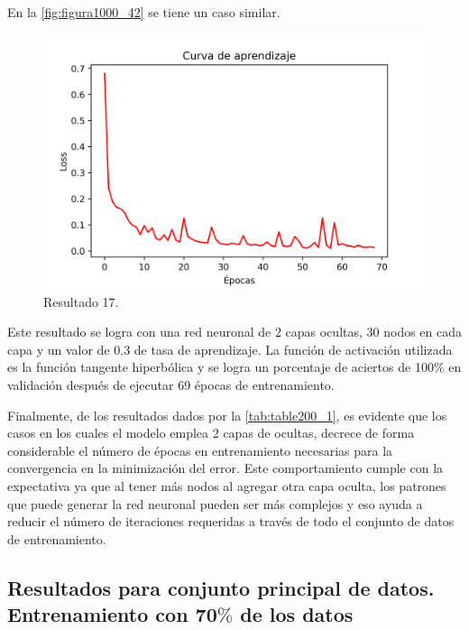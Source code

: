 En la \autoref{fig:figura1000_42} se tiene un caso similar.


\begin{figure}[h]
	\centering
	\includegraphics[scale=0.71]{imgss192.png}
	\caption{Resultado 17.}
	\label{fig:figura1000_42}
\end{figure} 

Este resultado se logra con una red neuronal de 2 capas ocultas, 30 nodos en cada capa y un valor de 0.3 de tasa de aprendizaje. La función de activación utilizada es la función tangente hiperbólica y se logra un porcentaje 
de aciertos de 100$\%$ en validación después de ejecutar 69 épocas de entrenamiento. 

Finalmente, de los resultados dados por la \autoref{tab:table200_1}, es evidente que los casos en los cuales el modelo emplea 2 capas de ocultas, decrece de forma considerable el número de épocas en entrenamiento necesarias 
para la convergencia en la minimización del error. Este comportamiento cumple con la expectativa ya que al tener más nodos al agregar otra capa oculta, los patrones que puede generar la red neuronal pueden ser más complejos 
y eso ayuda a reducir el número de iteraciones requeridas a través de todo el conjunto de datos de entrenamiento. 

\clearpage

\subsection{Resultados para conjunto principal de datos. Entrenamiento con 70$\%$ de los datos}

